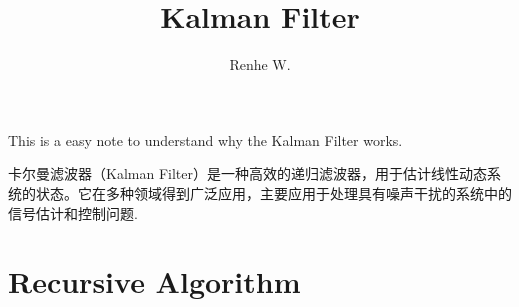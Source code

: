 \documentclass[UTF8,12pt]{ctexart}
\title{Kalman Filter}
\author{Renhe W.}
\date{ }
\numberwithin{equation}{section}%
\begin{document}
		
	\maketitle
	\tableofcontents%
	\listoffigures%
	\listoftables%
	\newpage
	\kaishu
	
	
		
	This is a easy note to understand why the Kalman Filter works. %
	
	卡尔曼滤波器（Kalman Filter）是一种高效的递归滤波器，用于估计线性动态系统的状态。它在多种领域得到广泛应用，主要应用于处理具有噪声干扰的系统中的信号估计和控制问题.
	
	\section{Recursive Algorithm\label{Recursive Algorithm}} 
	
	
	\newpage
	
\end{document}
